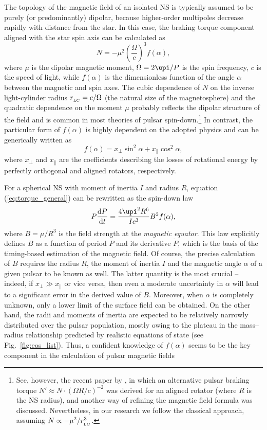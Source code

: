 \documentclass[fleqn,usenatbib]{mnras}
\begin{document}
The topology of the magnetic field of an isolated NS is typically
assumed to be purely (or predominantly) dipolar, because higher-order multipoles decrease rapidly with distance from the star. In this
case, the braking torque component aligned with the star spin axis
can be calculated as
\begin{equation}
	N =  - \mu^2  \left (\dfrac{\Omega}{c} \right )^3  f(\alpha),
	\label{eq:torque_general}
\end{equation}
where $\mu$ is the dipolar magnetic moment, $\Omega = 2\upi/P$ is the spin
frequency, $c$ is the speed of light, while $f(\alpha)$  is the dimensionless function of the angle $\alpha$ between the magnetic and spin axes.
The cubic dependence of $N$ on the inverse light-cylinder radius
$r_{\rm _{LC}} = c/\Omega$ (the natural size of the magnetosphere) and the quadratic
dependence on the moment $\mu$ probably reflects the dipolar structure
of the field and is common in most theories of pulsar spin-down.\footnote{See, however, the recent paper by \cite{petr16}, in which an alternative
pulsar braking torque $N' \approx N\cdot (\Omega R/c)^{-2}$ was derived for an aligned rotator
(where $R$ is the NS radius), and another way of refining the magnetic field
formula was discussed. Nevertheless, in our research we follow the classical
approach, assuming $N \propto -\mu^2/r^3_{\rm _{LC}}$.} In contrast, the particular form of $f(\alpha)$ is highly dependent on the
adopted physics and can be generically written as
\begin{equation}
	f(\alpha) = x_{\perp} \sin^2\alpha + x_{\parallel}\cos^2\alpha,
	\label{eq:f_general}
\end{equation}
where $x_{\perp}$ and $x_{\parallel}$ are the coefficients describing the losses of
rotational energy by perfectly orthogonal and aligned rotators,
respectively.

For a spherical NS with moment of inertia $I$ and radius $R$, equation (\ref{eq:torque_general}) can be rewritten as the spin-down law
\begin{equation}
    P\dfrac{{\rm d}P}{{\rm d}t} = \dfrac{4\upi^2 R^6}{Ic^3} B^2 f(\alpha),
    \label{eq:spindown_general}
\end{equation}
where $B = \mu/R^3$ is the field strength at the {\it magnetic equator}. This
law explicitly defines $B$ as a function of period $P$ and its derivative
$\dot P$, which is the basis of the timing-based estimation of the magnetic
field. Of course, the precise calculation of $B$ requires the radius $R$,
the moment of inertia $I$ and the magnetic angle $\alpha$ of a given pulsar to
be known as well. The latter quantity is the most crucial -- indeed,
if $x_{\perp} \gg x_{\parallel}$ or vice versa, then even a moderate uncertainty in $\alpha$
will lead to a significant error in the derived value of $B$. Moreover,
when $\alpha$ is completely unknown, only a lower limit of the surface
field can be obtained. On the other hand, the radii and moments of
inertia are expected to be relatively narrowly distributed over the
pulsar population, mostly owing to the plateau in the mass--radius
relationship predicted by realistic equations of state (see Fig.~\ref{fig:eos_list}).
Thus, a confident knowledge of $f(\alpha)$ seems to be the key component
in the calculation of pulsar magnetic fields
\end{document}
